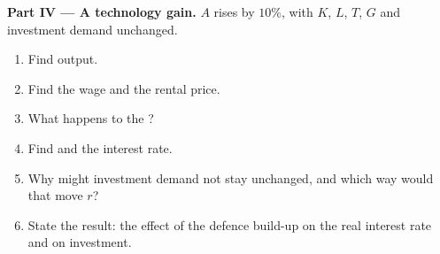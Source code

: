 \begin{problem}
\medskip\noindent\textbf{Part IV --- A technology gain.} $A$ rises by $10\%$, with $K$, $L$,
$T$, $G$ and investment demand unchanged.
\begin{enumerate}[resume]
  \item Find output.
  \item Find the wage and the rental price.
  \item What happens to the ?
  \item Find  and the interest rate.
  \item Why might investment demand not stay unchanged, and which way would that move $r$?
  \item State the result: the effect of the defence build-up on the real interest rate and on investment.
\end{enumerate}
\end{problem}
